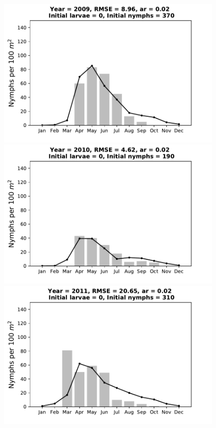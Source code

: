 \documentclass[a4paper, 11pt]{scrartcl}
\begin{document}
\begin{figure}[h!]
\centering
\begin{minipage}[c]{0.40\linewidth}
\includegraphics[width=\linewidth]{figures/s3/s3_2009}
\end{minipage}
\begin{minipage}[c]{0.40\linewidth}
\includegraphics[width=\linewidth]{figures/s3/s3_2010}
\end{minipage}
\begin{minipage}[c]{0.40\linewidth}
\includegraphics[width=\linewidth]{figures/s3/s3_2011}

\end{minipage}
\end{figure}
\end{document}
